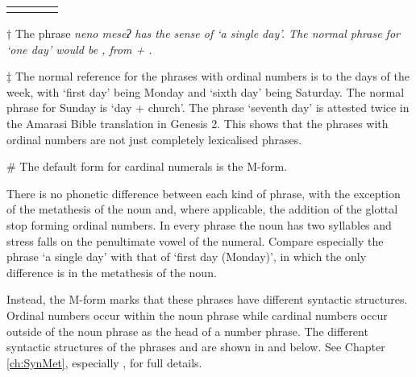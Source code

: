 \begin{table}[h]
\begin{threeparttable}[b]
\begin{tabular}{llll}
		\lspbottomrule
		\end{tabular}
			\begin{tablenotes}
				\item [†]
					The phrase \it{neno meseʔ} has the sense of `a single day'.
					The normal phrase for `one day' would be ,
					from  + .
				\item [‡]
					The normal reference for the phrases with ordinal numbers
					is to the days of the week, with  `first day'
					being Monday and  `sixth day' being Saturday.
					The normal phrase for Sunday is  `day + church'.
					The phrase  `seventh day' is attested twice
					in the Amarasi Bible translation in Genesis 2.
					This shows that the phrases with ordinal numbers
					are not just completely lexicalised phrases.
				\item [\#] The default form for cardinal numerals is the M-form.
			\end{tablenotes}
		\end{threeparttable}
\end{table}

There is no phonetic difference between each kind of phrase,
with the exception of the metathesis of the noun
and, where applicable, the addition of the glottal stop forming ordinal numbers.
In every phrase the noun has two syllables
and stress falls on the penultimate vowel of the numeral.
Compare especially the phrase  `a single day'
with that of  `first day (Monday)',
in which the only difference is in the metathesis of the noun.

Instead, the M-form marks that these phrases have different syntactic structures.
Ordinal numbers occur within the noun phrase
while cardinal numbers occur outside of the noun phrase
as the head of a number phrase.
The different syntactic structures of the phrases
 and 
are shown in  and  below.
See Chapter \ref{ch:SynMet}, especially , for full details.

\begin{multicols}{2}
	\begin{exe} \let\eachwordone=\textnormal \let\eachwordtwo=\ve
		\label{ex2:NenoMeseq}
		\label{ex2:NeonMeseq}
	\end{exe}
\end{multicols}


